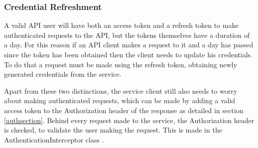     \subsubsection*{Credential Refreshment}
    A valid API user will have both an access token and a refresh token to make authenticated requests to the API, but the tokens themselves have a duration of a day.
    For this reason if an API client makes a request to it and a day has passed since the token has been obtained then the client needs to update his credentials.
    To do that a request must be made using the refresh token, obtaining newly generated credentials from the service.

    Apart from these two distinctions, the service client still also needs to worry about making authenticated requests, which can be made by adding a valid
    access token to the Authorization header of the response as detailed in section \ref{authsection}.
    Behind every request made to the service, the Authorization header is checked, to validate the user making the request. This is made in the AuthenticationInterceptor 
    class \cite{authinterceptor}. 

   
